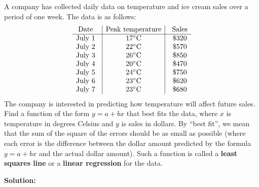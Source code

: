 \documentclass{ximera}
\begin{document}
\begin{example}\label{ex:least-squares-line}
  A company has collected daily data on temperature and ice cream
  sales over a period of one week. The data is as follows:
  \begin{equation*}
    \begin{array}{c@{~~~}|c|@{~~~}c}
      \mbox{Date} & \mbox{Peak temperature} & \mbox{Sales} \\\hline
      \mbox{July 1}  & 17\degC & \$320  \\   %
      \mbox{July 2}  & 22\degC & \$570  \\   %
      \mbox{July 3}  & 26\degC & \$850  \\   %
      \mbox{July 4}  & 20\degC & \$470  \\   %
      \mbox{July 5}  & 24\degC & \$750  \\   %
      \mbox{July 6}  & 23\degC & \$620  \\   %
      \mbox{July 7}  & 23\degC & \$680  \\   %
    \end{array}
  \end{equation*}
  The company is interested in predicting how temperature will affect
  future sales. Find a function of the form $y=a+bx$ that best fits
  the data, where $x$ is temperature in degrees Celsius and $y$ is
  sales in dollars. By ``best fit'', we mean that the sum of the
  square of the errors should be as small as possible (where each
  error is the difference between the dollar amount predicted by the
  formula $y=a+bx$ and the actual dollar amount).  Such a function is
  called a \textbf{least squares line}%
   or a \textbf{linear regression}%
   for the data.

  \textbf{Solution:}


\end{example}
\end{document}
